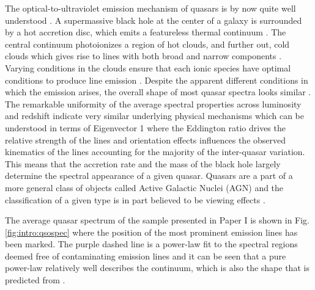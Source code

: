 The optical-to-ultraviolet emission mechanism of quasars is by now quite well
understood \citep{Elvis1994}. A supermassive black hole at the center of a
galaxy is surrounded by a hot accretion disc, which emits a featureless thermal
continuum \citep{Shakura1973, Pereyra2006}. The central continuum photoionizes a
region of hot clouds, and further out, cold clouds which gives rise to lines
with both broad and narrow components \citep{Elvis2001}.  Varying conditions in
the clouds ensure that each ionic species have optimal conditions to produce
line emission \citep{Baldwin1995}. Despite the apparent different conditions in
which the emission arises, the overall shape of most quasar spectra looks
similar
\citep{Dietrich2002}. The remarkable uniformity of the average spectral
properties across luminosity and redshift indicate very similar underlying
physical mechanisms which can be understood in terms of Eigenvector 1
\citep{Boroson1992, Francis1992} where the Eddington ratio drives the relative
strength of the lines and orientation effects influences the observed kinematics
of the lines \citep{Shen2014a} accounting for the majority of the inter-quasar
variation. This means that the accretion rate and the mass of the black hole
largely determine the spectral appearance of a given quasar. Quasars are a part
of a more general class of objects called Active Galactic Nuclei (AGN) and the
classification of a given type
is in part believed to be viewing effects
\citep{Elvis2001}.


The average quasar spectrum of the sample presented in Paper I is shown in Fig.\,\ref{fig:intro:qsospec} where the position of the most prominent emission lines
has been marked. The purple dashed line is a power-law fit to the spectral regions
deemed free of contaminating emission lines and it can be seen that a pure
power-law relatively well describes the continuum, which is also the shape that
is predicted from \citet{Pereyra2006}.

